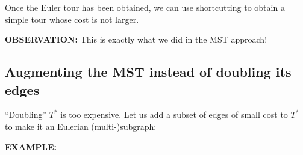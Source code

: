 Once the Euler tour has been obtained, we can use shortcutting to obtain a simple tour whose cost is not larger.

\textbf{OBSERVATION:} This is exactly what we did in the MST approach!
\subsection{Augmenting the MST instead of doubling its edges}
``Doubling'' $T^*$ is too expensive. Let us add a subset of edges of small cost to $T^*$ to make it an Eulerian (multi-)subgraph:

\textbf{EXAMPLE:}
